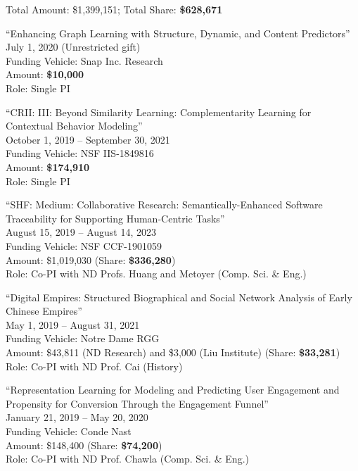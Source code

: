 \documentclass[10pt]{article}
\newenvironment{myindentpar}[1]%
{\begin{list}{}%
         {\setlength{\leftmargin}{#1}}%
         \item[]%
}
{\end{list}}
\newcounter{list}
\begin{document}
\begin{myindentpar}{0.75cm}

\hspace{-0.75cm} Total Amount: \$1,399,151; Total Share: \textbf{\$628,671}

\hspace{-0.75cm}``Enhancing Graph Learning with Structure, Dynamic, and Content Predictors''\\
July 1, 2020 (Unrestricted gift) \\
Funding Vehicle: Snap Inc. Research\\
Amount: \textbf{\$10,000} \\
Role: {Single PI}

\hspace{-0.75cm}``CRII: III: Beyond Similarity Learning: Complementarity Learning for Contextual Behavior Modeling''\\
October 1, 2019 -- September 30, 2021 \\
Funding Vehicle: NSF IIS-1849816 \\
Amount: \textbf{\$174,910} \\
Role: {Single PI}

\hspace{-0.75cm}``SHF: Medium: Collaborative Research: Semantically-Enhanced Software Traceability for Supporting Human-Centric Tasks''\\
August 15, 2019 -- August 14, 2023 \\
Funding Vehicle: NSF CCF-1901059 \\
Amount: \$1,019,030 (Share: \textbf{\$336,280}) \\
Role: {Co-PI} with ND Profs. Huang and Metoyer (Comp. Sci. \& Eng.)

\hspace{-0.75cm}``Digital Empires: Structured Biographical and Social Network Analysis of Early Chinese Empires''\\
May 1, 2019 -- August 31, 2021 \\
Funding Vehicle: Notre Dame RGG \\
Amount: \$43,811 (ND Research) and \$3,000 (Liu Institute) (Share: \textbf{\$33,281}) \\
Role: {Co-PI} with ND Prof. Cai (History)

\hspace{-0.75cm}``Representation Learning for Modeling and Predicting User Engagement and Propensity for Conversion Through the Engagement Funnel''\\
January 21, 2019 -- May 20, 2020 \\
Funding Vehicle: Conde Nast \\
Amount: \$148,400 (Share: \textbf{\$74,200}) \\
Role: {Co-PI} with ND Prof. Chawla (Comp. Sci. \& Eng.)

\end{myindentpar}
\end{document}
